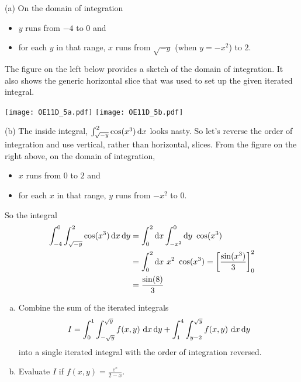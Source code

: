 \begin{solution}
(a)  On the domain of integration
\begin{itemize}
\item 
  $y$ runs from $-4$ to $0$ and
\item
  for each $y$ in that range, $x$ runs from $\sqrt{-y}$ (when $y=-x^2$)
  to $2$.
\end{itemize}
The figure on the left below provides a sketch of the domain of integration.
It also shows the generic horizontal slice that was used to set up the given 
iterated integral.

\begin{center}
     \texttt{[image: OE11D\_5a.pdf]}\qquad
     \texttt{[image: OE11D\_5b.pdf]}
\end{center}


(b) The inside integral, $\int_{\sqrt{-y}}^2 \cos(x^3)\,\mathrm{d}x$
looks nasty. So let's reverse the order of integration and use vertical,
rather than horizontal, slices. From the
figure on the right above, on the domain of integration,
\begin{itemize}
\item 
  $x$ runs from $0$ to $2$ and
\item
  for each $x$ in that range, $y$ runs from $-x^2$ 
  to $0$.
\end{itemize}
So the integral
\begin{align*}
\int_{-4}^0\int_{\sqrt{-y}}^2 \cos(x^3)\,\mathrm{d}x\,\mathrm{d}y
&=\int_0^2\mathrm{d}x\int_{-x^2}^0\mathrm{d}y\ \cos(x^3) \\
&=\int_0^2\mathrm{d}x\ x^2\ \cos(x^3) 
=\left[\frac{\sin(x^3)}{3}\right]_0^2 \\
&=\frac{\sin(8)}{3}
\end{align*}
\end{solution}


\begin{question}[M200 2012A] %
\begin{enumerate}[(a)]
\item
Combine the sum of the iterated integrals
\begin{equation*}
I = \int_0^1\int_{-\sqrt{y}}^{\sqrt{y}} f(x,y)\ \dee{x}\,\dee{y}
   + \int_1^4\int_{y-2}^{\sqrt{y}} f(x,y)\ \dee{x}\,\dee{y}
\end{equation*}
into a single iterated integral with the order of integration reversed.
\item
Evaluate $I$ if $f(x,y)=\frac{e^x}{2-x}$.
\end{enumerate}
\end{question}

